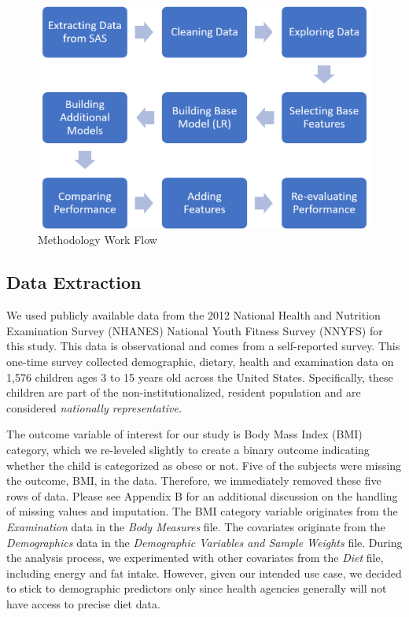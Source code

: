 \documentclass[twoside,11pt]{article}
\begin{document}
\begin{figure}[h]
  \centering 
  \includegraphics[width=6in]{flow_chart_process_2.png} 
  \caption{Methodology Work Flow}
  \label{fig:example} 
\end{figure} 

\subsection{Data Extraction} 
We used publicly available data from the 2012 National Health and Nutrition Examination Survey (NHANES) National Youth Fitness Survey (NNYFS) for this study. This data is observational and comes from a self-reported survey. This one-time survey collected demographic, dietary, health and examination data on 1,576 children ages 3 to 15 years old across the United States. Specifically, these children are part of the non-institutionalized, resident population and are considered {\em nationally representative.}

The outcome variable of interest for our study is Body Mass Index (BMI) category, which we re-leveled slightly to create a binary outcome indicating whether the child is categorized as obese or not. Five of the subjects were missing the outcome, BMI, in the data. Therefore, we immediately removed these five rows of data. Please see Appendix B for an additional discussion on the handling of missing values and imputation. The BMI category variable originates from the {\em Examination} data in the {\em Body Measures} file. The covariates originate from the {\em Demographics} data in the {\em Demographic Variables and Sample Weights} file. During the analysis process, we experimented with other covariates from the {\em Diet} file, including energy and fat intake. However, given our intended use case, we decided to stick to demographic predictors only since health agencies generally will not have access to precise diet data.
\end{document}
